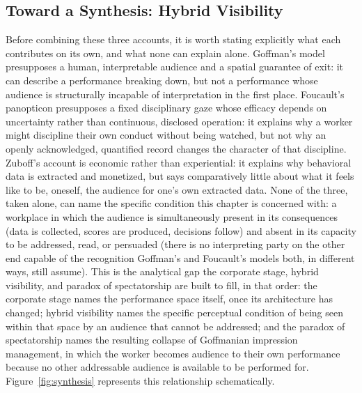 \documentclass[10pt]{article}
\begin{document}
\subsection{Toward a Synthesis: Hybrid Visibility}

Before combining these three accounts, it is worth stating explicitly what each contributes on its own, and what none can explain alone. Goffman's model presupposes a human, interpretable audience and a spatial guarantee of exit: it can describe a performance breaking down, but not a performance whose audience is structurally incapable of interpretation in the first place. Foucault's panopticon presupposes a fixed disciplinary gaze whose efficacy depends on uncertainty rather than continuous, disclosed operation: it explains why a worker might discipline their own conduct without being watched, but not why an openly acknowledged, quantified record changes the character of that discipline. Zuboff's account is economic rather than experiential: it explains why behavioral data is extracted and monetized, but says comparatively little about what it feels like to be, oneself, the audience for one's own extracted data. None of the three, taken alone, can name the specific condition this chapter is concerned with: a workplace in which the audience is simultaneously present in its consequences (data is collected, scores are produced, decisions follow) and absent in its capacity to be addressed, read, or persuaded (there is no interpreting party on the other end capable of the recognition Goffman's and Foucault's models both, in different ways, still assume). This is the analytical gap the corporate stage, hybrid visibility, and paradox of spectatorship are built to fill, in that order: the corporate stage names the performance space itself, once its architecture has changed; hybrid visibility names the specific perceptual condition of being seen within that space by an audience that cannot be addressed; and the paradox of spectatorship names the resulting collapse of Goffmanian impression management, in which the worker becomes audience to their own performance because no other addressable audience is available to be performed for. Figure~\ref{fig:synthesis} represents this relationship schematically.
\end{document}
